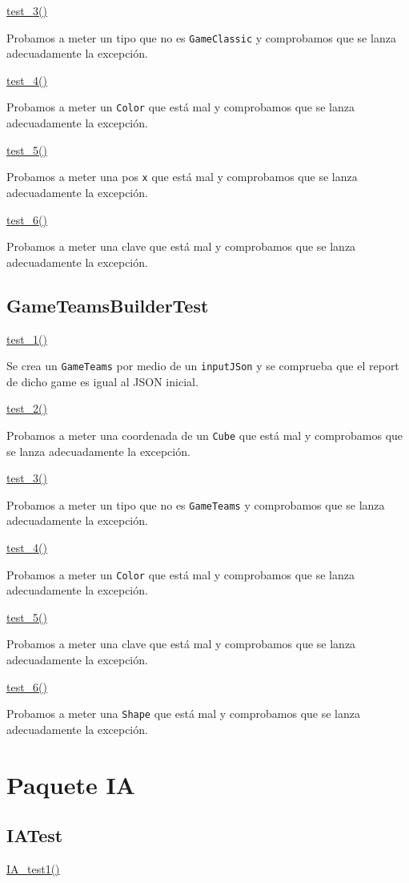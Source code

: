\documentclass[12pt,a4paper,openright]{book}
\theoremstyle{break}
\begin{document}
\underline{test\_3()}

Probamos a meter un tipo que no es \texttt{GameClassic} y comprobamos que se lanza adecuadamente la excepción.

\underline{test\_4()}

Probamos a meter un \texttt{Color} que está mal y comprobamos que se lanza adecuadamente la excepción.

\underline{test\_5()}

Probamos a meter una pos \texttt{x} que está mal y comprobamos que se lanza adecuadamente la excepción.

\underline{test\_6()}

Probamos a meter una clave que está mal y comprobamos que se lanza adecuadamente la excepción.

\subsection{GameTeamsBuilderTest}
\underline{test\_1()}

Se crea un \texttt{GameTeams} por medio de un \texttt{inputJSon} y se comprueba que el report de dicho game es igual al JSON inicial.

\underline{test\_2()}

Probamos a meter una coordenada de un \texttt{Cube} que está mal y comprobamos que se lanza adecuadamente la excepción.

\underline{test\_3()}

Probamos a meter un tipo que no es \texttt{GameTeams} y comprobamos que se lanza adecuadamente la excepción.

\underline{test\_4()}

Probamos a meter un \texttt{Color} que está mal y comprobamos que se lanza adecuadamente la excepción.

\underline{test\_5()}

Probamos a meter una clave que está mal y comprobamos que se lanza adecuadamente la excepción.

\underline{test\_6()}

Probamos a meter una \texttt{Shape} que está mal y comprobamos que se lanza adecuadamente la excepción.

\section{Paquete IA}
\subsection{IATest}
\underline{IA\_test1()}
\end{document}
